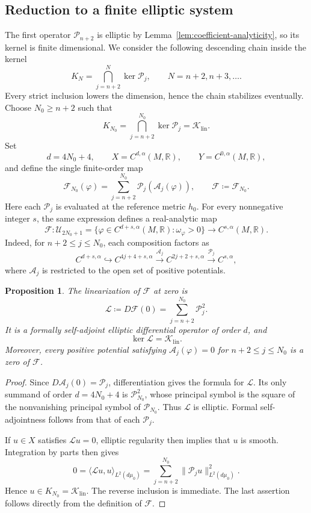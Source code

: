 \documentclass[11pt,reqno]{amsart}
\theoremstyle{corollary}
\theoremstyle{conjecture}
\theoremstyle{assumption}
\theoremstyle{proposition}
\newtheorem{proposition}[theorem]{Proposition}
\theoremstyle{remark}
\numberwithin{equation}{section}
\begin{document}
\subsection{Reduction to a finite elliptic system}
\label{subsec:elliptic-reduction}
The first operator $\mathcal P_{n+2}$ is elliptic by Lemma~\ref{lem:coefficient-analyticity}, so its kernel is finite dimensional. We consider the following descending chain inside the kernel
\[
K_N=\bigcap_{j=n+2}^N \ker \mathcal P_j,\qquad N=n+2,n+3,\ldots .
\]
Every strict inclusion lowers the dimension, hence the chain stabilizes eventually. Choose $N_0\geq n+2$ such that
\begin{equation}\label{eq:actual-linearized-kernel}
K_{N_0}=\bigcap_{j=n+2}^{N_0} \ker \mathcal P_j=\mathcal K_{\operatorname{lin}}.
\end{equation}
Set
\[
d=4N_0+4,\qquad X=C^{d,\alpha}(M,\mathbb R),\qquad Y=C^{0,\alpha}(M,\mathbb R),
\]
and define the single finite-order map
\[
\mathcal F_{N_0}(\varphi)=\sum\limits_{j=n+2}^{N_0}\mathcal P_j\left(\mathcal A_j(\varphi)\right),\qquad \mathcal F\coloneq \mathcal F_{N_0}.
\]
Here each $\mathcal P_j$ is evaluated at the reference metric $h_0$. For every nonnegative integer $s$, the same expression defines
a real-analytic map
\[
\mathcal F\colon\mathcal U_{2N_0+1}=\{\varphi\in C^{d+s,\alpha}(M,\mathbb R)\colon\omega_\varphi>0\}\longrightarrow C^{s,\alpha}(M,\mathbb R).
\]
Indeed, for $n+2\leq j\leq N_0$, each composition factors as
\[
C^{d+s,\alpha}\hookrightarrow C^{4j+4+s,\alpha}\xrightarrow{\mathcal A_j} C^{2j+2+s,\alpha}\xrightarrow{\mathcal P_j} C^{s,\alpha},
\]
where $\mathcal A_j$ is restricted to the open set of positive potentials.

\begin{proposition}\label{prop:finite-elliptic-reduction}
The linearization of $\mathcal F$ at zero is
\[
\mathcal L\coloneq D\mathcal F(0)=\sum_{j=n+2}^{N_0}\mathcal P_j^2.
\]
It is a formally self-adjoint elliptic differential operator of order $d$, and
\[
\ker\mathcal L=\mathcal K_{\operatorname{lin}}.
\]
Moreover, every positive potential satisfying $\mathcal A_j(\varphi)=0$ for $n+2\leq j\leq N_0$ is a zero of $\mathcal F$.
\end{proposition}
\begin{proof}
Since $D\mathcal A_j(0)=\mathcal P_j$, differentiation gives the formula for $\mathcal L$. Its only summand of order $d=4N_0+4$ is
$\mathcal P_{N_0}^2$, whose principal symbol is the square of the nonvanishing principal symbol of $\mathcal P_{N_0}$. Thus $\mathcal L$ is elliptic. Formal self-adjointness follows from that of each $\mathcal P_j$.

If $u\in X$ satisfies $\mathcal Lu=0$, elliptic regularity then implies that $u$ is smooth. Integration by parts then gives
\[
0=\langle\mathcal Lu,u\rangle_{L^2(d\mu_0)}=\sum_{j=n+2}^{N_0}\|\mathcal P_ju\|_{L^2(d\mu_0)}^2.
\]
Hence $u\in K_{N_0}=\mathcal K_{\operatorname{lin}}$. The reverse inclusion is immediate. The last assertion follows directly from the definition of $\mathcal F$.
\end{proof}
\end{document}
